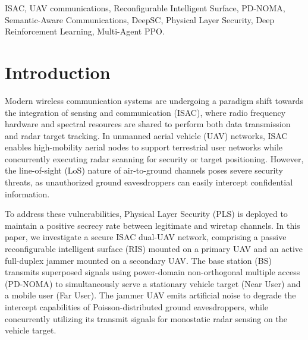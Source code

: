 \documentclass[journal,onecolumn]{IEEEtran}
\begin{document}
\begin{IEEEkeywords}
ISAC, UAV communications, Reconfigurable Intelligent Surface, PD-NOMA, Semantic-Aware Communications, DeepSC, Physical Layer Security, Deep Reinforcement Learning, Multi-Agent PPO.
\end{IEEEkeywords}

\IEEEpeerreviewmaketitle

\section{Introduction}
Modern wireless communication systems are undergoing a paradigm shift towards the integration of sensing and communication (ISAC), where radio frequency hardware and spectral resources are shared to perform both data transmission and radar target tracking. In unmanned aerial vehicle (UAV) networks, ISAC enables high-mobility aerial nodes to support terrestrial user networks while concurrently executing radar scanning for security or target positioning. However, the line-of-sight (LoS) nature of air-to-ground channels poses severe security threats, as unauthorized ground eavesdroppers can easily intercept confidential information.

To address these vulnerabilities, Physical Layer Security (PLS) is deployed to maintain a positive secrecy rate between legitimate and wiretap channels. In this paper, we investigate a secure ISAC dual-UAV network, comprising a passive reconfigurable intelligent surface (RIS) mounted on a primary UAV and an active full-duplex jammer mounted on a secondary UAV. The base station (BS) transmits superposed signals using power-domain non-orthogonal multiple access (PD-NOMA) to simultaneously serve a stationary vehicle target (Near User) and a mobile user (Far User). The jammer UAV emits artificial noise to degrade the intercept capabilities of Poisson-distributed ground eavesdroppers, while concurrently utilizing its transmit signals for monostatic radar sensing on the vehicle target.
\end{document}
